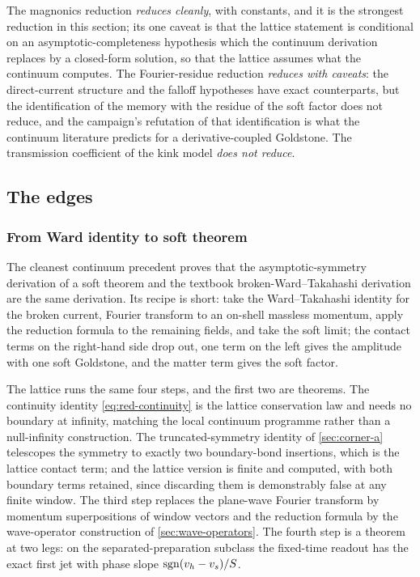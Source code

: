 \begin{observation}
\label{obs:verdict-memory}
The magnonics reduction \emph{reduces cleanly}, with constants, and it is the
strongest reduction in this section; its one caveat is that the lattice
statement is conditional on an asymptotic-completeness hypothesis which the
continuum derivation replaces by a closed-form solution, so that the lattice
assumes what the continuum computes. The Fourier-residue reduction
\emph{reduces with caveats}: the direct-current structure and the falloff
hypotheses have exact counterparts, but the identification of the memory with
the residue of the soft factor does not reduce, and the campaign's refutation of
that identification is what the continuum literature predicts for a
derivative-coupled Goldstone. The transmission coefficient of the kink model
\emph{does not reduce}.
\end{observation}

\subsection{The edges}
\label{sec:reduction-edges}

\subsubsection*{From Ward identity to soft theorem}

The cleanest continuum precedent proves that the asymptotic-symmetry derivation
of a soft theorem and the textbook broken-Ward--Takahashi derivation are the
same derivation. Its recipe is short: take the Ward--Takahashi identity for the
broken current, Fourier transform to an on-shell massless momentum, apply the
reduction formula to the remaining fields, and take the soft limit; the contact
terms on the right-hand side drop out, one term on the left gives the amplitude
with one soft Goldstone, and the matter term gives the soft factor.

The lattice runs the same four steps, and the first two are theorems. The
continuity identity \eqref{eq:red-continuity} is the lattice conservation law
and needs no boundary at infinity, matching the local continuum programme rather
than a null-infinity construction. The truncated-symmetry identity of
\cref{sec:corner-a} telescopes the symmetry to exactly two boundary-bond
insertions, which is the lattice contact term; and the lattice version is finite
and computed, with both boundary terms retained, since discarding them is
demonstrably false at any finite window. The third step replaces the plane-wave
Fourier transform by momentum superpositions of window vectors and the reduction
formula by the wave-operator construction of \cref{sec:wave-operators}. The
fourth step is a theorem at two legs: on the separated-preparation subclass the
fixed-time readout has the exact first jet with phase slope $\operatorname{sgn}(v_h-v_s)/S$.

